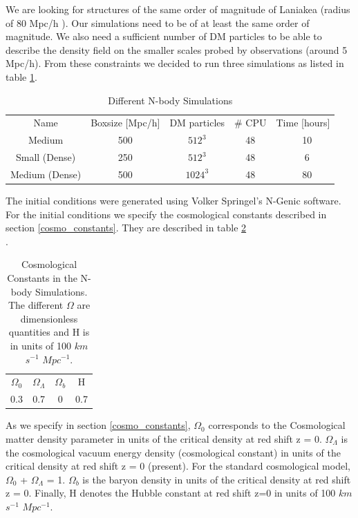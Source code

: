 \documentclass[12pt]{article}
\begin{document}
\begin{par}
We are looking for structures of the same order of
 magnitude of Laniakea (radius of 80 Mpc/h \cite{tully_laniakea_2014}). Our simulations need to be
   of at least the same order of magnitude. We also
    need a sufficient number of DM particles to
     be able to describe the density field on the smaller scales probed by observations (around 5 Mpc/h). From these constraints we decided to run three simulations as listed in table \ref{tab:sims}. 
\end{par}
\begin{table}[ht]
    \centering
    \begin{tabular}{|c|c|c|c|c|}
        Name & Boxsize [Mpc/h] & DM particles & \# CPU & Time [hours] \\
        Medium & 500 & $512^{3}$ & 48 & ~ 10 \\
        Small (Dense) & 250 & $512^{3}$ & 48 & ~ 6  \\
        Medium (Dense) & 500 & $1024^{3}$ & 48 & ~ 80\\
    \end{tabular}
    \caption{Different N-body Simulations}
    \label{tab:sims}
\end{table}
\FloatBarrier


The initial conditions were generated using Volker
 Springel's N-Genic software. For the initial
  conditions we specify the cosmological constants
   described in section \ref{cosmo_constants}. They
    are described in table \ref{tab:consts}\\.
   
  
 \begin{table}[ht]
    \centering
    \begin{tabular}{|c|c|c|c|}
        $\Omega_0$ & $\Omega_{\Lambda}$ & $\Omega_b$ & H \\
        0.3 &  0.7 & 0 & 0.7 \\
    \end{tabular}
    \caption{Cosmological Constants in the N-body Simulations. The different $\Omega$ are dimensionless quantities and H is in units of 100 
    $km$ $s^{-1}$
     $Mpc^{-1}$. }
    \label{tab:consts}
\end{table}
\FloatBarrier

As we specify in section \ref{cosmo_constants}, $\Omega_0$  corresponds to the Cosmological matter
 density parameter in units of the critical density at
red shift z = 0. $\Omega_{\Lambda}$ is the cosmological
 vacuum energy density (cosmological constant) in
  units of the critical density at red shift z = 0 (present). 
For the standard cosmological model, $\Omega_0$ + $\Omega_{\Lambda}$ = 1.
 $\Omega_b$ is the baryon density in units
  of the critical density at red shift z = 0. Finally, H denotes the Hubble
    constant at red shift z=0 in  units of 100 
    $km$ $s^{-1}$
     $Mpc^{-1}$. \\
\end{document}
